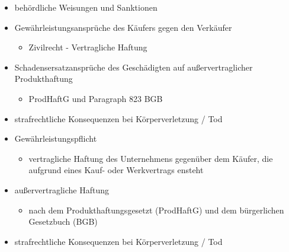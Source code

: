 \documentclass[12pt]{article}
\begin{document}
\begin{note}

    \begin{field}
        \begin{itemize}
            \item behördliche Weisungen und Sanktionen
            \item Gewährleistungsansprüche des Käufers gegen den Verkäufer
                \begin{itemize}
                    \item Zivilrecht - Vertragliche Haftung
                \end{itemize}
            \item Schadensersatzansprüche des Geschädigten auf außervertraglicher Produkthaftung
                \begin{itemize}
                    \item ProdHaftG und Paragraph 823 BGB
                \end{itemize}
            \item strafrechtliche Konsequenzen bei Körperverletzung / Tod
        \end{itemize}
    \end{field}
\end{note}

\begin{note}

    \begin{field}
        \begin{itemize}
            \item Gewährleistungspflicht
                \begin{itemize}
                    \item vertragliche Haftung des Unternehmens gegenüber dem Käufer, die aufgrund eines Kauf- oder Werkvertrags ensteht
                \end{itemize}
            \item außervertragliche Haftung
                \begin{itemize}
                    \item nach dem Produkthaftungsgesetzt (ProdHaftG) und dem bürgerlichen Gesetzbuch (BGB)
                \end{itemize}
            \item strafrechtliche Konsequenzen bei Körperverletzung / Tod
        \end{itemize}
    \end{field}
\end{note}
\end{document}

